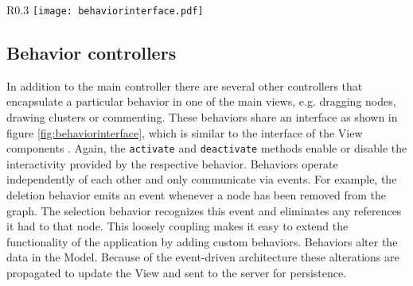 \begin{wrapfigure}{R}{0.3\textwidth}
\texttt{[image: behaviorinterface.pdf]}
\caption{Class diagram of the Behavior interface}
\label{fig:behaviorinterface}
\end{wrapfigure}

\subsection{Behavior controllers}
\label{sec:behavior}

In addition to the main controller there are several other controllers that encapsulate a particular behavior in one of the main views, e.g. dragging nodes, drawing clusters or commenting. These behaviors share an interface as shown in figure \ref{fig:behaviorinterface}, which is similar to the interface of the View components . Again, the \texttt{activate} and \texttt{deactivate} methods enable or disable the interactivity provided by the respective behavior. Behaviors operate independently of each other and only communicate via events. For example, the deletion behavior emits an event whenever a node has been removed from the graph. The selection behavior recognizes this event and eliminates any references it had to that node. This loosely coupling makes it easy to extend the functionality of the application by adding custom behaviors. Behaviors alter the data in the Model. Because of the event-driven architecture these alterations are propagated to update the View and sent to the server for persistence.


